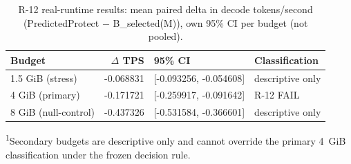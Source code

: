 \begin{table}[t]
\centering
\caption{R-12 real-runtime results: mean paired delta in decode tokens/second (PredictedProtect $-$ B\_selected(M)), own 95\% CI per budget (not pooled).}
\label{tab:c4-runtime}
\small
\begin{tabular}{@{}lrll@{}}
\toprule
Budget & $\Delta$ TPS & 95\% CI & Classification \\
\midrule
1.5 GiB (stress) & -0.068831 & [-0.093256, -0.054608] & descriptive only \\
4 GiB (primary) & -0.171721 & [-0.259917, -0.091642] & R-12 FAIL \\
8 GiB (null-control) & -0.437326 & [-0.531584, -0.366601] & descriptive only \\
\bottomrule
\end{tabular}
\vspace{2pt}
\par\footnotesize\textsuperscript{1}Secondary budgets are descriptive only and cannot override the primary 4~GiB classification under the frozen decision rule.
\end{table}
